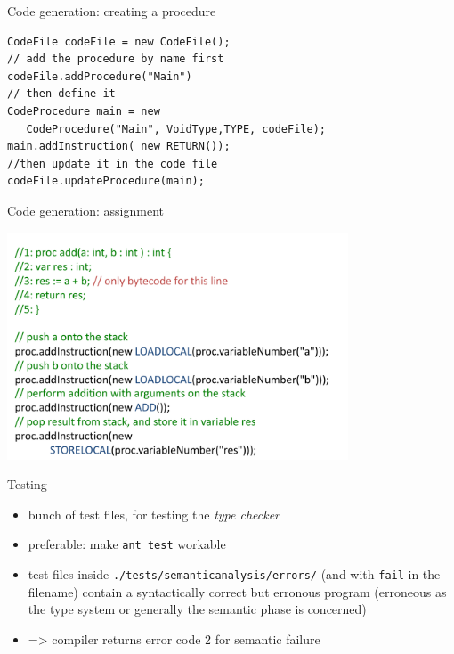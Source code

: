 \documentclass{beamer}
\begin{document}
\begin{frame}[label={sec:orgbd7520f},fragile,plain]{Code generation: creating a procedure}
 \lstset{language=java,label= ,caption= ,captionpos=b,numbers=none}
\begin{lstlisting}
CodeFile codeFile = new CodeFile();
// add the procedure by name first
codeFile.addProcedure("Main")
// then define it
CodeProcedure main = new 
   CodeProcedure("Main", VoidType,TYPE, codeFile);
main.addInstruction( new RETURN());
//then update it in the code file
codeFile.updateProcedure(main);
\end{lstlisting}
\end{frame}

\begin{frame}[label={sec:orgc0348a2}]{Code generation: assignment}
\begin{center}
 \includegraphics[width=0.76\textwidth]{figures/snaps/codegen-assignment}
\end{center}
\end{frame}



\begin{frame}[label={sec:org5d3fc70},fragile]{Testing}
 \begin{itemize}
\item bunch of test files, for testing the \emph{type checker}
\item preferable: make \texttt{ant test} workable

\item test files inside \texttt{./tests/semanticanalysis/errors/} (and with \texttt{fail} in
the filename) contain a syntactically correct but erronous program
(erroneous as the type system or generally the semantic phase is
concerned)

\item => compiler returns error code 2 for semantic failure
\end{itemize}
\end{frame}
\end{document}
